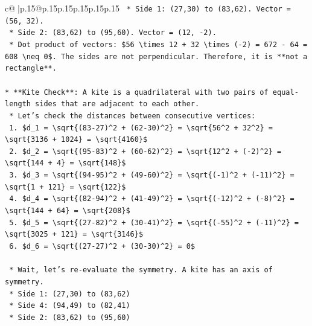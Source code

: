 \documentclass{article}
\begin{document}
{\begin{supertabular}{c@{$\;$}|p{.15\linewidth}@{}p{.15\linewidth}p{.15\linewidth}p{.15\linewidth}p{.15\linewidth}p{.15\linewidth}}
{{{\texttt{    *   Side 1: (27,30) to (83,62). Vector = (56, 32).} \\
\texttt{    *   Side 2: (83,62) to (95,60). Vector = (12, {-}2).} \\
\texttt{    *   Dot product of vectors: \$56 \textbackslash{}times 12 + 32 \textbackslash{}times ({-}2) = 672 {-} 64 = 608 \textbackslash{}neq 0\$. The sides are not perpendicular. Therefore, it is **not a rectangle**.} \\
\\ 
\texttt{*   **Kite Check**: A kite is a quadrilateral with two pairs of equal{-}length sides that are adjacent to each other.} \\
\texttt{    *   Let's check the distances between consecutive vertices:} \\
\texttt{        1.  \$d\_1 = \textbackslash{}sqrt\{(83{-}27)\^{}2 + (62{-}30)\^{}2\} = \textbackslash{}sqrt\{56\^{}2 + 32\^{}2\} = \textbackslash{}sqrt\{3136 + 1024\} = \textbackslash{}sqrt\{4160\}\$} \\
\texttt{        2.  \$d\_2 = \textbackslash{}sqrt\{(95{-}83)\^{}2 + (60{-}62)\^{}2\} = \textbackslash{}sqrt\{12\^{}2 + ({-}2)\^{}2\} = \textbackslash{}sqrt\{144 + 4\} = \textbackslash{}sqrt\{148\}\$} \\
\texttt{        3.  \$d\_3 = \textbackslash{}sqrt\{(94{-}95)\^{}2 + (49{-}60)\^{}2\} = \textbackslash{}sqrt\{({-}1)\^{}2 + ({-}11)\^{}2\} = \textbackslash{}sqrt\{1 + 121\} = \textbackslash{}sqrt\{122\}\$} \\
\texttt{        4.  \$d\_4 = \textbackslash{}sqrt\{(82{-}94)\^{}2 + (41{-}49)\^{}2\} = \textbackslash{}sqrt\{({-}12)\^{}2 + ({-}8)\^{}2\} = \textbackslash{}sqrt\{144 + 64\} = \textbackslash{}sqrt\{208\}\$} \\
\texttt{        5.  \$d\_5 = \textbackslash{}sqrt\{(27{-}82)\^{}2 + (30{-}41)\^{}2\} = \textbackslash{}sqrt\{({-}55)\^{}2 + ({-}11)\^{}2\} = \textbackslash{}sqrt\{3025 + 121\} = \textbackslash{}sqrt\{3146\}\$} \\
\texttt{        6.  \$d\_6 = \textbackslash{}sqrt\{(27{-}27)\^{}2 + (30{-}30)\^{}2\} = 0\$} \\
\\ 
\texttt{    *   Wait, let's re{-}evaluate the symmetry. A kite has an axis of symmetry.} \\
\texttt{        *   Side 1: (27,30) to (83,62)} \\
\texttt{        *   Side 4: (94,49) to (82,41)} \\
\texttt{        *   Side 2: (83,62) to (95,60)} \\
}}}
\end{supertabular}}
\end{document}
